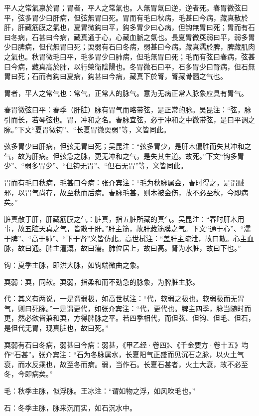 \documentclass[12pt]{ctexbook}
\begin{document}

\begin{yuanwen}
平人之常氣禀於胃；胃者，平人之常氣也。人無胃氣曰逆，逆者死。春胃微弦曰平，弦多胃少曰肝病，但弦無胃曰死。胃而有毛曰秋病，毛甚曰今病，藏真散於肝，肝藏筋膜之氣也，夏胃微鈎曰平，鈎多胃少曰心病，但钩無胃曰死；胃而有石曰冬病，石甚曰今病，藏真通于心，心藏血脈之氣也。長夏胃微耎弱曰平，弱多胃少曰脾病，但代無胃曰死；耎弱有石曰冬病，弱甚曰今病。藏真濡於脾，脾藏肌肉之氣也。秋胃微毛曰平，毛多胃少曰肺病，但毛無胃曰死；毛而有弦曰春病，弦甚曰今病，藏真高於肺，以行榮衛陰陽也。冬胃微石曰平，石多胃少曰腎病，但石無胃曰死；石而有鈎曰夏病，鈎甚曰今病，藏真下於腎，腎藏骨髓之气也。
\end{yuanwen}


\begin{jiaozhu}
	\item 胃者，平人之常气也：常气，正常人的脉气。意为无病正常人脉象应具有胃气。
	\item 春胃微弦曰平：春季（肝脏）脉有胃气而略带弦，是正常的脉。吴昆注：“弦，脉引而长，若琴弦也。胃，冲和之名。春脉宜弦，必于冲和之中微带弦，是曰平调之脉。”下文“夏胃微钩”、“长夏胃微耎弱”等，义皆同此。
	\item 弦多胃少曰肝病，但弦无胃曰死；吴昆注：“弦多胃少，是肝木偏胜而失其冲和之气，故为肝病。但弦急之脉，更无冲和之气，是失其生道。故死。”下文“钩多胃少”、“弱多胃少”、“但钩无胃”、“但石无胃”等，义皆同此。
	\item 胃而有毛曰秋病，毛甚曰今病：张介宾注：“毛为秋脉属金，春时得之，是谓贼邪，以胃气尚存，故至秋而后病。春脉毛甚，则木被金伤，故不必至秋，今即病矣。”
	\item 脏真散于肝，肝藏筋膜之气：脏真，指五脏所藏的真气。吴昆注：“春时肝木用事，故五脏天真之气，皆散于肝。”肝主筋，故肝藏筋膜之气。下文“通于心”、“濡于脾”、“高于肺”、“下于肾”义皆仿此。高世栻注：“盖肝主疏泄，故曰散。心主血脉，故曰通。脾主灌溉，故曰濡。肺位居上，故曰高。肾为水脏，故曰下也。”
	\item 钩：夏季主脉，即洪大脉，如钩端微曲之象。
	\item 耎弱：耎，同软。耎弱，指柔和而不劲急的脉象，为脾脏主脉。
	\item 代：其义有两说，一是谓弱极，如高世栻注：“代，软弱之极也。软弱极而无胃气，则曰死脉。”一是谓更代，如张介宾注：“代，更代也。脾主四季，脉当随时而更，然必欲皆兼和耎，方得脾脉之平。若四季相代，而但弦、但钩、但毛、但石，是但代无胃，现真脏也，故曰死。”
	\item 耎弱有石曰冬病，弱甚曰今病：弱甚，《甲乙经·卷四》、《千金要方·卷十五》均作“石甚”。张介宾注：“石为冬脉属水，长夏阳气正盛而见沉石之脉，以火土气衰，而水反乘也，故至冬而病。弱，当作石。长夏石甚者，火土大衰，故不必至冬，今即病矣。”
	\item 毛：秋季主脉，似浮脉。王冰注：“谓如物之浮，如风吹毛也。”
	\item 石：冬季主脉，脉来沉而实，如石沉水中。
\end{jiaozhu}
\end{document}
